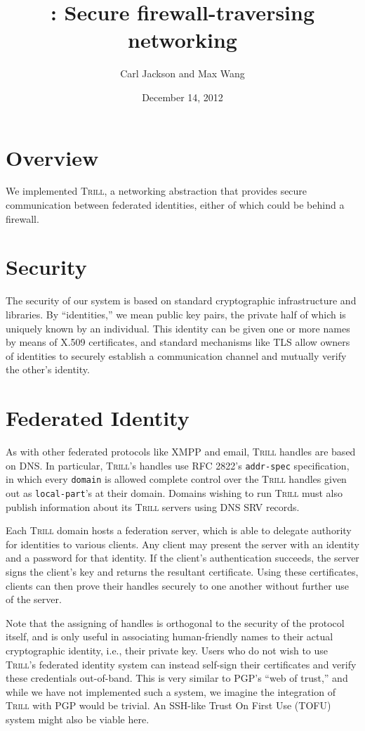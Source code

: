 \documentclass[12pt]{article}
\title{\Trill: Secure firewall-traversing networking}
\author{Carl Jackson and Max Wang}
\date{December 14, 2012}
\makeatletter
\newcommand{\Trill}{\textsc{Trill}\xspace}
\renewcommand{\maketitle}{%
  \thispagestyle{plain}%
  \begin{center}%
    {\LARGE \@title \par}%
    {\large \@author \par}%
    {\large \@date \par}%
  \end{center}%
}
\makeatother
\begin{document}
\maketitle

\section*{Overview}
We implemented \Trill, a networking abstraction that provides secure
communication between federated identities, either of which could be behind a
firewall.

\section*{Security}
The security of our system is based on standard cryptographic infrastructure and
libraries. By ``identities,'' we mean public key pairs, the private half of
which is uniquely known by an individual. This identity can be given one or more
names by means of X.509 certificates, and standard mechanisms like TLS allow
owners of identities to securely establish a communication channel and mutually
verify the other's identity.

\section*{Federated Identity}
As with other federated protocols like XMPP and email, \Trill handles are based
on DNS. In particular, \Trill's handles use RFC 2822's \verb`addr-spec`
specification, in which every \verb`domain` is allowed complete control over the
\Trill handles given out as \verb`local-part`'s at their domain. Domains wishing
to run \Trill must also publish information about its \Trill servers using DNS
SRV records.

Each \Trill domain hosts a federation server, which is able to delegate
authority for identities to various clients.  Any client may present the server
with an identity and a password for that identity.  If the client's
authentication succeeds, the server signs the client's key and returns the
resultant certificate.  Using these certificates, clients can then prove their
handles securely to one another without further use of the server.

Note that the assigning of handles is orthogonal to the security of the protocol
itself, and is only useful in associating human-friendly names to their actual
cryptographic identity, i.e., their private key. Users who do not wish to use
\Trill's federated identity system can instead self-sign their certificates and
verify these credentials out-of-band. This is very similar to PGP's ``web of
trust,'' and while we have not implemented such a system, we imagine the
integration of \Trill with PGP would be trivial. An SSH-like Trust On First Use
(TOFU) system might also be viable here.
\end{document}
